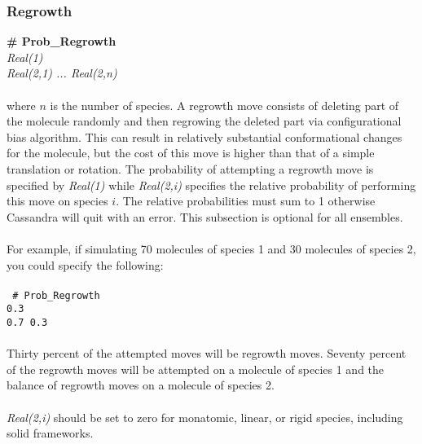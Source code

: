 %
%
%
\subsubsection{Regrowth}
{\bf \# Prob\_Regrowth} \\
{\it Real(1)} \\
{\it Real(2,1) ... Real(2,n)} \\ \\
%
where $n$ is the number of species.
A regrowth move consists of deleting part of the molecule randomly and
then regrowing the deleted part via configurational bias algorithm.
This can result in relatively substantial conformational changes for
the molecule, but the cost of this move is higher than that of a
simple translation or rotation. The probability of attempting a
regrowth move is specified by {\it Real(1)} while {\it Real(2,i)}
specifies the relative probability of performing this move on species $i$.
The relative probabilities must sum to 1 otherwise Cassandra will quit with an error.
This subsection is optional for all ensembles. \\ \\
%
For example, if simulating 70 molecules of species 1 and 30 molecules of species 2,
you could specify the following: \\ \\
%
\texttt{
\# Prob\_Regrowth \\
0.3 \\
0.7 0.3 } \\ \\
%
Thirty percent of the attempted moves will be regrowth moves.
Seventy percent of the regrowth moves will be attempted on a molecule of species 1
and the balance of regrowth moves on a molecule of species 2. \\ \\
%
{\it Real(2,i)} should be set to zero for monatomic, linear, or rigid species, including solid frameworks.
%
%
%
